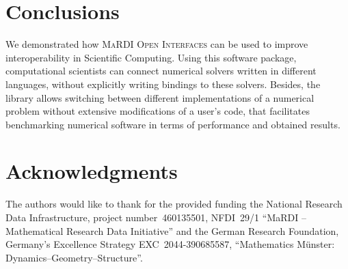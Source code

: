\documentclass{mmposter}
\newcommand{\OIF}{\textsc{MaRDI Open Interfaces}\xspace}
\begin{document}
\section*{Conclusions}
We demonstrated how \OIF{} can be used to improve
interoperability in Scientific Computing.
Using this software package, computational scientists can connect numerical
solvers written in different languages, without explicitly writing bindings
to these solvers.
Besides, the library allows switching between different implementations
of a numerical problem without extensive modifications of a user's code,
that facilitates benchmarking numerical software in terms of performance
and obtained results.




\section*{Acknowledgments}
The authors would like to thank for the provided funding
the National Research Data Infrastructure,
project number~460135501, NFDI~29/1 “MaRDI – Mathematical
Research Data Initiative”
and
the German Research Foundation,
Germany's Excellence Strategy EXC~2044-390685587,
``Mathematics Münster: Dynamics--Geometry--Structure''.

\printbibliography{}



\end{document}
